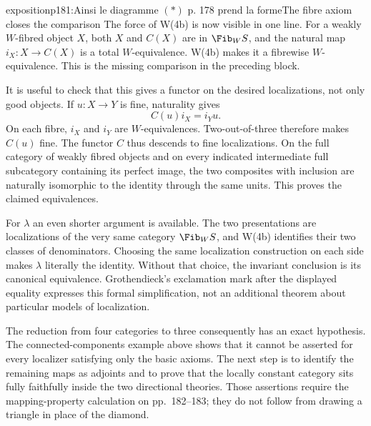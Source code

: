 \begin{dcomment}{exposition}{p181:Ainsi le diagramme $(\ast)$ p. 178 prend la forme}{The fibre axiom closes the comparison}
The force of W(4b) is now visible in one line. For a weakly $W$-fibred object $X$, both $X$ and $C(X)$ are in $\Fib_W S$, and the natural map $i_X:X\to C(X)$ is a total $W$-equivalence. W(4b) makes it a fibrewise $W$-equivalence. This is the missing comparison in the preceding block.

It is useful to check that this gives a functor on the desired localizations, not only good objects. If $u:X\to Y$ is fine, naturality gives
\[
 C(u)i_X=i_Yu.
\]
On each fibre, $i_X$ and $i_Y$ are $W$-equivalences. Two-out-of-three therefore makes $C(u)$ fine. The functor $C$ thus descends to fine localizations. On the full category of weakly fibred objects and on every indicated intermediate full subcategory containing its perfect image, the two composites with inclusion are naturally isomorphic to the identity through the same units. This proves the claimed equivalences.

For $\lambda$ an even shorter argument is available. The two presentations are localizations of the very same category $\Fib_W S$, and W(4b) identifies their two classes of denominators. Choosing the same localization construction on each side makes $\lambda$ literally the identity. Without that choice, the invariant conclusion is its canonical equivalence. Grothendieck's exclamation mark after the displayed equality expresses this formal simplification, not an additional theorem about particular models of localization.

The reduction from four categories to three consequently has an exact hypothesis. The connected-components example above shows that it cannot be asserted for every localizer satisfying only the basic axioms. The next step is to identify the remaining maps as adjoints and to prove that the locally constant category sits fully faithfully inside the two directional theories. Those assertions require the mapping-property calculation on pp.~182--183; they do not follow from drawing a triangle in place of the diamond.
\end{dcomment}

